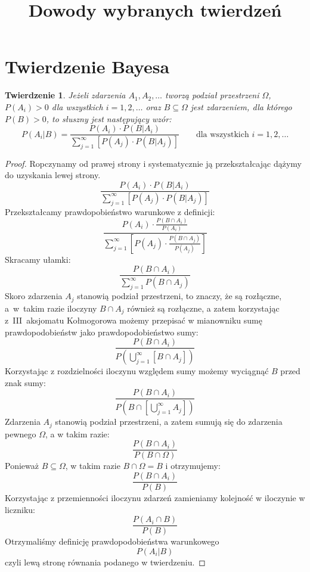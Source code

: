 \documentclass{mwart}
\title{Dowody wybranych twierdzeń}
\newtheorem*{theorem}{Twierdzenie}
\begin{document}
\section*{Twierdzenie Bayesa}
\begin{theorem}
Jeżeli zdarzenia $A_1, A_2, \ldots$ tworzą podział przestrzeni $\Omega$, $P(A_i)>0$ dla wszystkich $i=1,2,\ldots$ oraz $B\subseteq\Omega$ jest zdarzeniem, dla którego $P(B)>0$, to słuszny jest następujący wzór:
\[ P(A_i|B) = \frac{P(A_i)\cdot P(B|A_i)}{\sum_{j=1}^\infty \left[ P(A_j)\cdot P(B|A_j)\right]} \qquad \text{dla wszystkich } i=1,2,\ldots \]
\end{theorem}

\begin{proof}
Ropczynamy od prawej strony i systematycznie ją przekształcając dążymy do uzyskania lewej strony.
\[ \frac{P(A_i)\cdot P(B|A_i)}{\sum_{j=1}^\infty \left[ P(A_j)\cdot P(B|A_j)\right]} \]
Przekształcamy prawdopobieństwo warunkowe z definicji: 
\[ \frac{P(A_i)\cdot \frac{P(B\cap A_i)}{P(A_i)}}{\sum_{j=1}^\infty \left[ P(A_j)\cdot \frac{P(B\cap A_j)}{P(A_j)}\right]}
\]
Skracamy ułamki:
\[
 \frac{P(B\cap A_i)}{\sum_{j=1}^\infty P(B\cap A_j)}
\]
Skoro zdarzenia $A_j$ stanowią podział przestrzeni, to znaczy, że są rozłączne, a~w~takim razie iloczyny $B\cap A_j$ również są rozłączne, a zatem korzystając z~III~aksjomatu Kołmogorowa możemy przepisać w mianowniku sumę prawdopodobieństw jako prawdopodobieństwo sumy:
\[
 \frac{P(B\cap A_i)}{P\left(\bigcup_{j=1}^\infty [B\cap A_j]\right)}
\]
Korzystając z rozdzielności iloczynu względem sumy możemy wyciągnąć $B$ przed znak sumy:
\[
 \frac{P(B\cap A_i)}{P\left(B \cap \left[\bigcup_{j=1}^\infty A_j\right]\right)}
\]
Zdarzenia $A_j$ stanowią podział przestrzeni, a zatem sumują się do zdarzenia pewnego $\Omega$, a w takim razie:
\[
 \frac{P(B\cap A_i)}{P\left(B \cap \Omega\right)}
\]
Ponieważ $B\subseteq\Omega$, w takim razie $B\cap\Omega=B$ i otrzymujemy:
\[
 \frac{P(B\cap A_i)}{P\left(B\right)}
\]
Korzystając z przemienności iloczynu zdarzeń zamieniamy kolejność w iloczynie w liczniku:
\[
 \frac{P(A_i\cap B)}{P\left(B\right)}
\]
Otrzymaliśmy definicję prawdopodobieństwa warunkowego
\[ P(A_i|B) \]
czyli lewą stronę równania podanego w twierdzeniu.
\end{proof}
\end{document}
